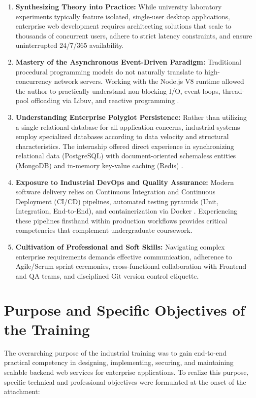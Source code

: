 \begin{enumerate}
    \item \textbf{Synthesizing Theory into Practice:} While university laboratory experiments typically feature isolated, single-user desktop applications, enterprise web development requires architecting solutions that scale to thousands of concurrent users, adhere to strict latency constraints, and ensure uninterrupted 24/7/365 availability.
    \item \textbf{Mastery of the Asynchronous Event-Driven Paradigm:} Traditional procedural programming models do not naturally translate to high-concurrency network servers. Working with the Node.js V8 runtime allowed the author to practically understand non-blocking I/O, event loops, thread-pool offloading via Libuv, and reactive programming \citep{tilkov2010node}.
    \item \textbf{Understanding Enterprise Polyglot Persistence:} Rather than utilizing a single relational database for all application concerns, industrial systems employ specialized databases according to data velocity and structural characteristics. The internship offered direct experience in synchronizing relational data (PostgreSQL) with document-oriented schemaless entities (MongoDB) and in-memory key-value caching (Redis) \citep{cattell2011scalable}.
    \item \textbf{Exposure to Industrial DevOps and Quality Assurance:} Modern software delivery relies on Continuous Integration and Continuous Deployment (CI/CD) pipelines, automated testing pyramids (Unit, Integration, End-to-End), and containerization via Docker \citep{merkel2014docker}. Experiencing these pipelines firsthand within production workflows provides critical competencies that complement undergraduate coursework.
    \item \textbf{Cultivation of Professional and Soft Skills:} Navigating complex enterprise requirements demands effective communication, adherence to Agile/Scrum sprint ceremonies, cross-functional collaboration with Frontend and QA teams, and disciplined Git version control etiquette.
\end{enumerate}

\section{Purpose and Specific Objectives of the Training}
\label{sec:intro_objectives}

The overarching purpose of the industrial training was to gain end-to-end practical competency in designing, implementing, securing, and maintaining scalable backend web services for enterprise applications. To realize this purpose, specific technical and professional objectives were formulated at the onset of the attachment:

